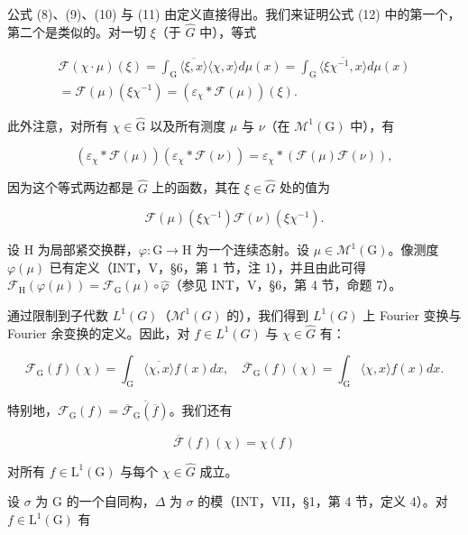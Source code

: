公式 (8)、(9)、(10) 与 (11) 由定义直接得出。我们来证明公式 (12) 中的第一个，第二个是类似的。对一切 \(\xi\)（于 \(\widehat{G}\) 中），等式

\[
\begin{array}{c} \mathcal {F} (\chi \cdot \mu) (\xi) = \int_ {\mathrm{G}} \overline {{\langle \xi , x \rangle}} \langle \chi , x \rangle d \mu (x) = \int_ {\mathrm{G}} \overline {{\langle \xi \chi^ {- 1} , x \rangle}} d \mu (x) \\ = \mathcal {F} (\mu) (\xi \chi^ {- 1}) = (\varepsilon_ {\chi} * \mathcal {F} (\mu)) (\xi). \end{array}
\]

此外注意，对所有 \(\chi\in\widehat{\mathrm{G}}\) 以及所有测度 \(\mu\) 与 \(\nu\)（在 \(\mathcal{M}^{1}(\mathrm{G})\) 中），有

\[
(\varepsilon_ {\chi} * \mathcal {F} (\mu)) (\varepsilon_ {\chi} * \mathcal {F} (\nu)) = \varepsilon_ {\chi} * (\mathcal {F} (\mu) \mathcal {F} (\nu)),\tag{13}
\]

因为这个等式两边都是 \(\widehat{G}\) 上的函数，其在 \(\xi\in\widehat{G}\) 处的值为

\[
\mathcal {F} (\mu) (\xi \chi^ {- 1}) \mathcal {F} (\nu) (\xi \chi^ {- 1}).
\]

设 H 为局部紧交换群，\(\varphi\colon\mathrm{G}\to\mathrm{H}\) 为一个连续态射。设 \(\mu\in\mathcal{M}^{1}(\mathrm{G})\)。像测度 \(\varphi(\mu)\) 已有定义（INT，V，§6，第 1 节，注 1），并且由此可得 \(\mathcal{F}_{\mathrm{H}}(\varphi(\mu))=\mathcal{F}_{\mathrm{G}}(\mu)\circ\widehat{\varphi}\)（参见 INT，V，§6，第 4 节，命题 7）。

通过限制到子代数 \(L^{1}(G)\)（\(\mathcal{M}^{1}(G)\) 的），我们得到 \(L^{1}(G)\) 上 Fourier 变换与 Fourier 余变换的定义。因此，对 \(f \in L^{1}(G)\) 与 \(\chi \in \widehat{G}\) 有：

\[
\mathcal {F} _ {\mathrm{G}} (f) (\chi) = \int_ {\mathrm{G}} \overline {{\langle \chi , x \rangle}} f (x) d x, \quad \overline {{\mathcal {F}}} _ {\mathrm{G}} (f) (\chi) = \int_ {\mathrm{G}} \langle \chi , x \rangle f (x) d x.\tag{14}
\]

特别地，\(\mathcal{F}_{\mathrm{G}}(f) = \overline{\overline{\mathcal{F}}_{\mathrm{G}}(\overline{f})}\)。我们还有

\[
\overline {{\mathcal {F}}} (f) (\chi) = \chi (f)\tag{15}
\]

对所有 \(f \in \mathrm{L}^{1}(\mathrm{G})\) 与每个 \(\chi \in \widehat{G}\) 成立。

设 \(\sigma\) 为 G 的一个自同构，\(\Delta\) 为 \(\sigma\) 的模（INT，VII，§1，第 4 节，定义 4）。对 \(f \in \mathrm{L}^1(\mathrm{G})\) 有

